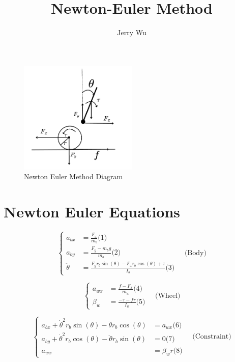 \documentclass[12pt]{article}
\begin{document}
\title{\Huge Newton-Euler Method}
\author{Jerry Wu}
\date{}
\maketitle

\begin{figure}[h]
    \centering
    \includegraphics[width=0.5\textwidth]{Newton_Euler_Diagram.png}
    \caption{Newton Euler Method Diagram}
    \label{fig:your-label}
\end{figure}

\section*{Newton Euler Equations}
\[
\left\{
\begin{aligned}
a_{bx} &= \frac{F_x}{m_b}\text{(1)} \\
a_{by} &= \frac{F_y - m_b g}{m_b} \text{(2)}\\
\ddot{\theta} &= \frac{F_y r_b \sin(\theta) - F_x r_b \cos(\theta) + \tau}{I_b}\text{(3)}
\end{aligned}
\right. \quad \text{(Body)}
\]


\[
\left\{
\begin{aligned}
a_{wx} &= \frac{f - F_x}{m_w}\text{(4)} \\
\beta_w &= \frac{-\tau - f r}{I_w}\text{(5)}
\end{aligned}
\right. \quad \text{(Wheel)}
\]

\[
\left\{
\begin{aligned}
a_{bx} + \dot{\theta}^2 r_b \sin(\theta) - \ddot{\theta} r_b \cos(\theta) &= a_{wx}\text{(6)} \\
a_{by} + \dot{\theta}^2 r_b \cos(\theta) - \ddot{\theta} r_b \sin(\theta) &= 0 \text{(7)}\\
a_{wx} &= \beta_w r\text{(8)}
\end{aligned}
\right. \quad \text{(Constraint)}
\]
\end{document}
